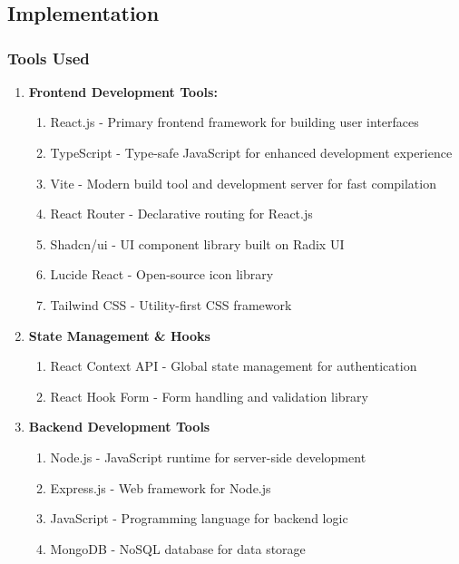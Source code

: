 \section*{\Large{}}
\label{5}
\subsection{Implementation}
\subsubsection{Tools Used}

\begin{enumerate}[label=\roman*.]
    \item \textbf{Frontend Development Tools:}
          \begin{enumerate}[label=$\bullet$]
              \item React.js \-- Primary frontend framework for building user interfaces
              \item TypeScript \-- Type-safe JavaScript for enhanced development experience
              \item Vite \-- Modern build tool and development server for fast compilation
              \item React Router \-- Declarative routing for React.js
              \item Shadcn/ui \-- UI component library built on Radix UI
              \item Lucide React \-- Open-source icon library
              \item Tailwind CSS \-- Utility-first CSS framework
          \end{enumerate}

    \item \textbf{State Management \& Hooks}
          \begin{enumerate}[label=$\bullet$]
              \item React Context API \-- Global state management for authentication
              \item React Hook Form \-- Form handling and validation library
          \end{enumerate}

    \item \textbf{Backend Development Tools}
          \begin{enumerate}[label=$\bullet$]
              \item Node.js \-- JavaScript runtime for server-side development
              \item Express.js \-- Web framework for Node.js
              \item JavaScript \-- Programming language for backend logic
              \item MongoDB \-- NoSQL database for data storage
          \end{enumerate}


\end{enumerate}
